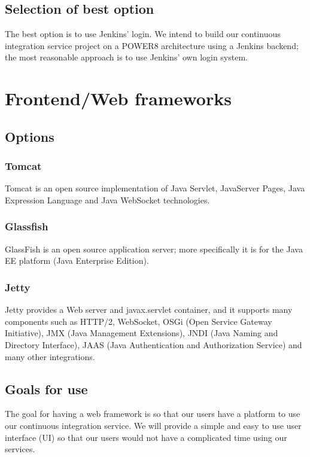 \documentclass[10pt,letterpaper,onecolumn,journal]{IEEEtran}
\begin{document}
\subsection{Selection of best option}
The best option is to use Jenkins’ login.
We intend to build our continuous integration service project on a POWER8 architecture using a Jenkins backend; the most reasonable approach is to use Jenkins’ own login system.

\section{Frontend/Web frameworks}
\subsection{Options}
\subsubsection{Tomcat}
Tomcat is an open source implementation of Java Servlet, JavaServer Pages, Java Expression Language and Java WebSocket technologies. 
\subsubsection{Glassfish}
GlassFish is an open source application server; more specifically it is for the Java EE platform (Java Enterprise Edition).
\subsubsection{Jetty}
Jetty provides a Web server and javax.servlet container, and it supports many components such as HTTP/2, WebSocket, OSGi (Open Service Gateway Initiative), JMX (Java Management Extensions), JNDI (Java Naming and Directory Interface), JAAS (Java Authentication and Authorization Service) and many other integrations.
\subsection{Goals for use}
The goal for having a web framework is so that our users have a platform to use our continuous integration service.
We will provide a simple and easy to use user interface (UI) so that our users would not have a complicated time using our services.
\end{document}
